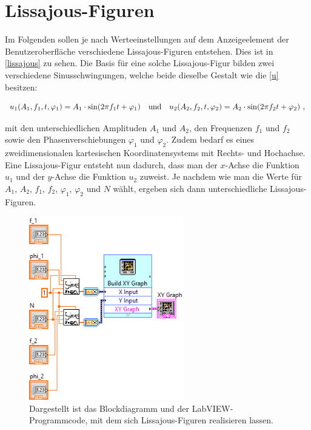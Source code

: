 \documentclass[
a4paper,
12pt,
pagesize,
ngerman
]{scrartcl}
\begin{document}
	\section{Lissajous-Figuren}
	
	Im Folgenden sollen je nach Werteeinstellungen auf dem Anzeigeelement der Benutzeroberfläche verschiedene Lissajous-Figuren entstehen. Dies ist in \cref{lissajous} zu sehen. Die Basis für eine solche Lissajous-Figur bilden zwei verschiedene Sinusschwingungen, welche beide dieselbe Gestalt wie die \cref{u} besitzen:
	
	\begin{equation} \label{u1u2}
	u_1(A_1,f_1,t,\varphi_1) = A_1 \cdot \sin(2\pi f_1 t + \varphi_1) \ \ \ \textnormal{und} \ \ \ u_2(A_2,f_2,t,\varphi_2) = A_2 \cdot \sin(2\pi f_2 t + \varphi_2) \ ,
	\end{equation}
	
	\noindent mit den unterschiedlichen Amplituden $A_1$ und $A_2$, den Frequenzen $f_1$ und $f_2$ sowie den Phasenverschiebungen $\varphi_1$ und $\varphi_2$. Zudem bedarf es eines zweidimensionalen kartesischen Koordinatensystems mit Rechts- und Hochachse. Eine Lissajous-Figur entsteht nun dadurch, dass man der $x$-Achse die Funktion $u_1$ und der $y$-Achse die Funktion $u_2$ zuweist. Je nachdem wie man die Werte für $A_1$, $A_2$, $f_1$, $f_2$, $\varphi_1$, $\varphi_2$ und $N$ wählt, ergeben sich dann unterschiedliche Lissajous-Figuren.
	
	\begin{figure}[H]
		\centering
		\includegraphics[width=0.6\textwidth]{EIRE2018Dateien/Tag1/lissajous-bilder/Lissajousd}
		\caption{Dargestellt ist das Blockdiagramm und der LabVIEW-Programmcode, mit dem sich Lissajous-Figuren realisieren lassen.}
		\label{lissajousprogrammcode}
	\end{figure}
\end{document}
